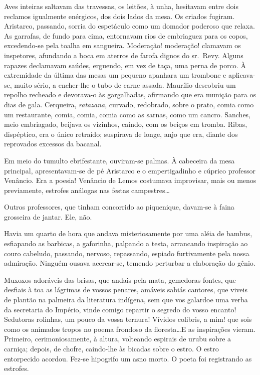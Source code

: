 Aves inteiras saltavam das travessas, os leitões, à unha,
hesitavam entre dois reclamos igualmente enérgicos, dos dois lados da
mesa. Os criados fugiram. Aristarco, passando, sorria do espetáculo
como um domador poderoso que relaxa. As garrafas, de fundo para cima,
entornavam rios de embriaguez para os copos, excedendo{}-se pela toalha
em sangueira. Moderação! moderação! clamavam os inspetores, afundando a
boca em aterros de farofa dignos do sr.~Revy. Alguns rapazes declamavam
saúdes, erguendo, em vez de taça, uma perna de porco. À extremidade da
última das mesas um pequeno apanhara um trombone e aplicava{}-se, muito
sério, a encher{}-lhe o tubo de carne assada. Maurílio descobriu um
repolho recheado e devorava{}-o às gargalhadas, afirmando que era
munição para os dias de gala. Cerqueira, \textit{ratazana}, curvado, redobrado,
sobre o prato, comia como um restaurante, comia, comia, comia como as
sarnas, como um cancro. Sanches, meio embriagado, beijava os vizinhos,
caindo, com os beiços em tromba. Ribas, dispéptico, era o único
retraído; suspirava de longe, anjo que era, diante dos reprovados
excessos da bacanal. 

Em meio do tumulto ebrifestante, ouviram{}-se
palmas. À cabeceira da mesa principal, apresentavam{}-se de pé Aristarco e
o empertigadinho e cúprico professor Venâncio. Era a poesia! Venâncio
de Lemos costumava improvisar, mais ou menos previamente, estrofes
análogas nas festas campestres\ldots 

Outros professores, que tinham concorrido ao piquenique, 
davam{}-se à faina grosseira de jantar. Ele, não. 

Havia um quarto de hora que andava misteriosamente por uma aléia
de bambus, esfiapando as barbicas, a gaforinha, palpando a testa,
arrancando inspiração ao couro cabeludo, passando, nervoso, repassando,
espiado furtivamente pela nossa admiração. Ninguém ousava acercar{}-se,
temendo perturbar a elaboração do gênio. 

Muxoxos adoráveis das brisas,
que andais pela mata, gemedoras fontes, que desfiais à toa as lágrimas
de vossos penares, amáveis sabiás cantores, que viveis de plantão na
palmeira da literatura indígena, sem que vos galardoe uma verba da
secretaria do Império, vinde comigo repartir o segredo do vosso
encanto! Sedutoras rolinhas, um pouco da vossa ternura! Vívidos
colibris, a mim! que sois como os animados tropos no poema frondoso da
floresta\ldots E as inspirações vieram. Primeiro, cerimoniosamente, à
altura, volteando espirais de urubu sobre a carniça; depois, de chofre,
caindo{}-lhe às bicadas sobre o estro. O estro entorpecido acordou.
Fez{}-se hipogrifo um asno morto. O poeta foi registrando as estrofes.


